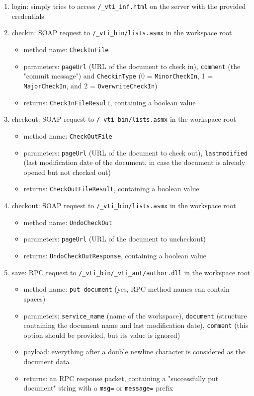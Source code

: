 \begin{enumerate}
\item login: simply tries to access \texttt{/\_vti\_inf.html} on the server with the provided credentials

\item checkin: SOAP request to \texttt{/\_vti\_bin/lists.asmx} in the workspace root
\begin{itemize}
\item method name: \texttt{CheckInFile}
\item parameters: \texttt{pageUrl} (URL of the document to check in), \texttt{comment} (the "commit message") and \texttt{CheckinType} (0 = \texttt{MinorCheckIn}, 1 = \texttt{MajorCheckIn}, and 2 = \texttt{OverwriteCheckIn})
\item returns: \texttt{CheckInFileResult}, containing a boolean value
\end{itemize}

\item checkout: SOAP request to \texttt{/\_vti\_bin/lists.asmx} in the workspace root
\begin{itemize}
\item method name: \texttt{CheckOutFile}
\item parameters: \texttt{pageUrl} (URL of the document to check out), \texttt{lastmodified} (last modification date of the document, in case the document is already opened but not checked out)
\item returns: \texttt{CheckOutFileResult}, containing a boolean value
\end{itemize}

\item checkout: SOAP request to \texttt{/\_vti\_bin/lists.asmx} in the workspace root
\begin{itemize}
\item method name: \texttt{UndoCheckOut}
\item parameters: \texttt{pageUrl} (URL of the document to uncheckout)
\item returns: \texttt{UndoCheckOutResponse}, containing a boolean value
\end{itemize}

\item save: RPC request to \texttt{/\_vti\_bin/\_vti\_aut/author.dll} in the workspace root
\begin{itemize}
\item method name: \texttt{put document} (yes, RPC method names can contain spaces)
\item parameters: \texttt{service\_name} (name of the workspace), \texttt{document} (structure containing the document name and last modification date), \texttt{comment} (this option should be provided, but its value is ignored)
\item payload: everything after a double newline character is considered as the document data
\item returns: an RPC response packet, containing a "successfully put document" string with a \texttt{msg=} or \texttt{message=} prefix
\end{itemize}


\end{enumerate}
